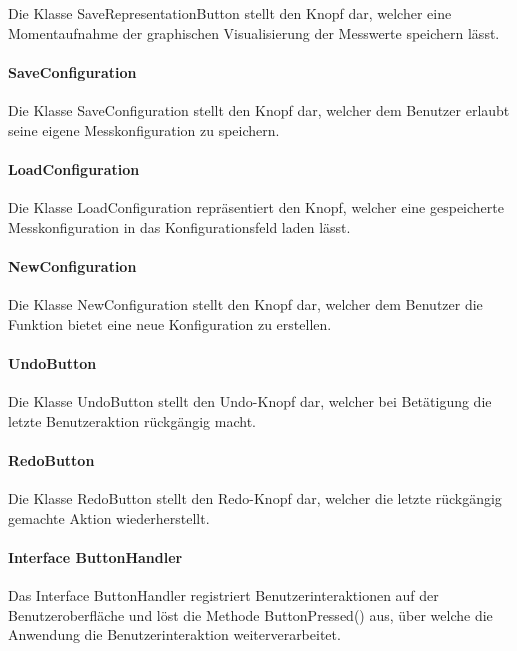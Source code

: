 \documentclass[parskip=full]{scrartcl}
\begin{document}
Die Klasse SaveRepresentationButton stellt den Knopf dar, welcher eine Momentaufnahme der graphischen Visualisierung der Messwerte speichern lässt.

\paragraph{SaveConfiguration}

Die Klasse SaveConfiguration stellt den Knopf dar, welcher dem Benutzer erlaubt seine eigene Messkonfiguration zu speichern.

\paragraph{LoadConfiguration} 

Die Klasse LoadConfiguration repräsentiert den Knopf, welcher eine gespeicherte Messkonfiguration in das Konfigurationsfeld laden lässt.

\paragraph{NewConfiguration}

Die Klasse NewConfiguration stellt den Knopf dar, welcher dem Benutzer die Funktion bietet eine neue Konfiguration zu erstellen.

\paragraph{UndoButton}

Die Klasse UndoButton stellt den Undo-Knopf dar, welcher bei Betätigung die letzte Benutzeraktion rückgängig macht.

\paragraph{RedoButton}

Die Klasse RedoButton stellt den Redo-Knopf dar, welcher die letzte rückgängig gemachte Aktion wiederherstellt.

\paragraph{Interface ButtonHandler}

Das Interface ButtonHandler registriert Benutzerinteraktionen auf der Benutzeroberfläche und löst die Methode ButtonPressed() aus, über welche die Anwendung die Benutzerinteraktion weiterverarbeitet.
\end{document}
